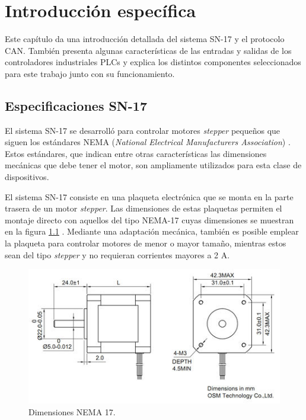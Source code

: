 \chapter{Introducción específica} %

\label{Chapter2}

Este capítulo da una introducción detallada del sistema SN-17 y el protocolo CAN. También presenta algunas características de las entradas y salidas de los controladores industriales PLCs y explica los distintos componentes seleccionados para este trabajo junto con su funcionamiento.

\section{Especificaciones SN-17}

El sistema SN-17 se desarrolló para controlar motores \textit{stepper} pequeños que siguen los estándares NEMA (\textit{National Electrical Manufacturers Association})  \citep{web_nema}. Estos estándares, que indican entre otras características las dimensiones mecánicas que debe tener el motor, son ampliamente utilizados para esta clase de dispositivos.

El sistema SN-17 consiste en una plaqueta electrónica que se monta en la parte trasera de un motor \textit{stepper}. Las dimensiones de estas plaquetas permiten el montaje directo con aquellos del tipo NEMA-17 cuyas dimensiones se muestran en la figura \ref{fig:dimensiones_nema_17} \citep{web_nema_17_dimensions}. Mediante una adaptación mecánica, también es posible emplear la plaqueta para controlar motores de menor o mayor tamaño, mientras estos sean del tipo \textit{stepper} y no requieran corrientes mayores a 2 A.

\begin{figure}[htbp]
	\centering
	\includegraphics[scale=.9]{./Figures/nema17.jpg}
	\caption{Dimensiones NEMA 17\protect\footnotemark .}
	\label{fig:dimensiones_nema_17}
\end{figure}

